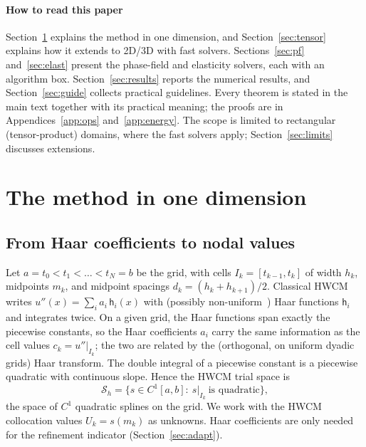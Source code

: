 \documentclass[preprint,12pt]{elsarticle}
\theoremstyle{remark}
\begin{document}
\paragraph{How to read this paper} Section~\ref{sec:method} explains the method in one dimension, and
Section~\ref{sec:tensor} explains how it extends to 2D/3D with fast solvers. Sections~\ref{sec:pf}
and~\ref{sec:elast} present the phase-field and elasticity solvers, each with an algorithm box.
Section~\ref{sec:results} reports the numerical results, and Section~\ref{sec:guide} collects
practical guidelines. Every theorem is stated in the main text together with its practical meaning;
the proofs are in Appendices~\ref{app:ops} and~\ref{app:energy}. The scope is limited to rectangular
(tensor-product) domains, where the fast solvers apply; Section~\ref{sec:limits} discusses
extensions.

\section{The method in one dimension}\label{sec:method}
\subsection{From Haar coefficients to nodal values}
Let $a=t_0<t_1<\dots<t_N=b$ be the grid, with cells $I_k=[t_{k-1},t_k]$ of width $h_k$, midpoints
$m_k$, and midpoint spacings $d_k=(h_k+h_{k+1})/2$. Classical HWCM writes
$u''(x)=\sum_ia_i\,\mathsf h_i(x)$ with (possibly non-uniform~\cite{dubeau2004nonuniform}) Haar
functions $\mathsf h_i$ and integrates twice. On a given grid, the Haar functions span exactly the
piecewise constants, so the Haar coefficients $a_i$ carry the same information as the cell values
$c_k=u''|_{I_k}$; the two are related by the (orthogonal, on uniform dyadic grids) Haar transform.
The double integral of a piecewise constant is a piecewise quadratic with continuous slope.
Hence the HWCM trial space is
\[
\mathcal S_h=\{s\in C^1[a,b]:\ s|_{I_k}\ \text{is quadratic}\},
\]
the space of $C^1$ quadratic splines on the grid. We work with the HWCM collocation values
$U_k=s(m_k)$ as unknowns. Haar coefficients are only needed for the refinement indicator
(Section~\ref{sec:adapt}).
\end{document}
